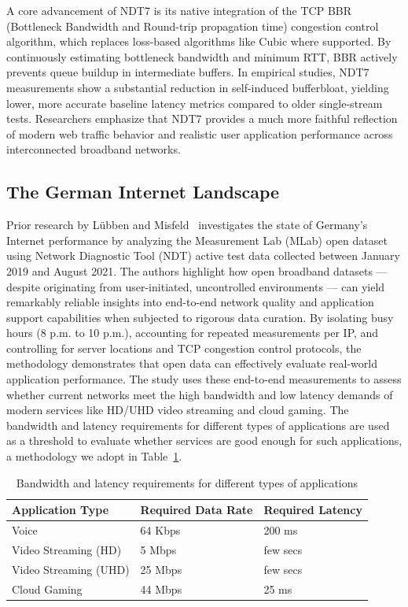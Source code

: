 \documentclass[sigconf,anonymous,review]{acmart}
\begin{document}
A core advancement of NDT7 is its native integration of the TCP BBR
(Bottleneck Bandwidth and Round-trip propagation time) congestion control
algorithm, which replaces loss-based algorithms like Cubic where supported.
By continuously estimating bottleneck bandwidth and minimum RTT, BBR
actively prevents queue buildup in intermediate buffers. In empirical
studies, NDT7 measurements show a substantial reduction in self-induced
bufferbloat, yielding lower, more accurate baseline latency metrics
compared to older single-stream tests. Researchers emphasize that NDT7
provides a much more faithful reflection of modern web traffic behavior and
realistic user application performance across interconnected broadband
networks.

\subsection{The German Internet Landscape}
Prior research by L\"ubben and Misfeld~\cite{Lubben2022} investigates the
state of Germany's Internet performance by analyzing the Measurement Lab
(MLab) open dataset using Network Diagnostic Tool (NDT) active test data
collected between January 2019 and August 2021. The authors highlight how
open broadband datasets --- despite originating from user-initiated,
uncontrolled environments --- can yield remarkably reliable insights into
end-to-end network quality and application support capabilities when
subjected to rigorous data curation. By isolating busy hours (8 p.m. to
10 p.m.), accounting for repeated measurements per IP, and controlling for
server locations and TCP congestion control protocols, the methodology
demonstrates that open data can effectively evaluate real-world application
performance. The study uses these end-to-end measurements to assess whether
current networks meet the high bandwidth and low latency demands of modern
services like HD/UHD video streaming and cloud gaming. The bandwidth and
latency requirements for different types of applications are used as a
threshold to evaluate whether services are good enough for such
applications, a methodology we adopt in Table~\ref{tab:app-requirements}.

\begin{table}
  \caption{Bandwidth and latency requirements for different types of applications}
  \label{tab:app-requirements}
  \begin{tabular}{lll}
    \toprule
    Application Type & Required Data Rate & Required Latency \\
    \midrule
    Voice                    & 64 Kbps & 200 ms \\
    Video Streaming (HD)     & 5 Mbps  & few secs \\
    Video Streaming (UHD)    & 25 Mbps & few secs \\
    Cloud Gaming             & 44 Mbps & 25 ms \\
    \bottomrule
  \end{tabular}
\end{table}
\end{document}
